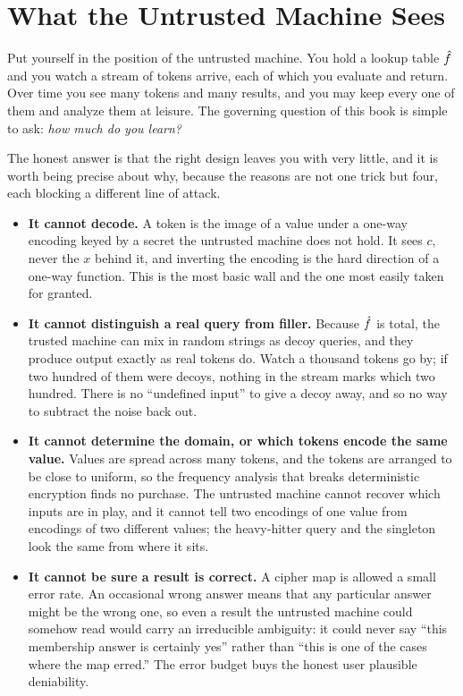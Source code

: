 \section{What the Untrusted Machine Sees}
\label{sec:untrusted-sees}

Put yourself in the position of the untrusted machine. You hold a lookup
table $\hat{f}$ and you watch a stream of tokens arrive, each of which you
evaluate and return. Over time you see many tokens and many results, and
you may keep every one of them and analyze them at leisure. The governing
question of this book is simple to ask: \emph{how much do you learn?}

The honest answer is that the right design leaves you with very little, and
it is worth being precise about why, because the reasons are not one trick
but four, each blocking a different line of attack.

\begin{itemize}
\item \textbf{It cannot decode.} A token is the image of a value under a
  one-way encoding keyed by a secret the untrusted machine does not hold.
  It sees $c$, never the $x$ behind it, and inverting the encoding is the
  hard direction of a one-way function. This is the most basic wall and the
  one most easily taken for granted.
\item \textbf{It cannot distinguish a real query from filler.} Because
  $\hat{f}$ is total, the trusted machine can mix in random strings as decoy
  queries, and they produce output exactly as real tokens do. Watch a
  thousand tokens go by; if two hundred of them were decoys, nothing in the
  stream marks which two hundred. There is no ``undefined input'' to give a
  decoy away, and so no way to subtract the noise back out.
\item \textbf{It cannot determine the domain, or which tokens encode the
  same value.} Values are spread across many tokens, and the tokens are
  arranged to be close to uniform, so the frequency analysis that breaks
  deterministic encryption finds no purchase. The untrusted machine cannot
  recover which inputs are in play, and it cannot tell two encodings of one
  value from encodings of two different values; the heavy-hitter query and
  the singleton look the same from where it sits.
\item \textbf{It cannot be sure a result is correct.} A cipher map is
  allowed a small error rate. An occasional wrong answer means that any
  particular answer might be the wrong one, so even a result the untrusted
  machine could somehow read would carry an irreducible ambiguity: it could
  never say ``this membership answer is certainly yes'' rather than ``this
  is one of the cases where the map erred.'' The error budget buys the
  honest user plausible deniability.
\end{itemize}

